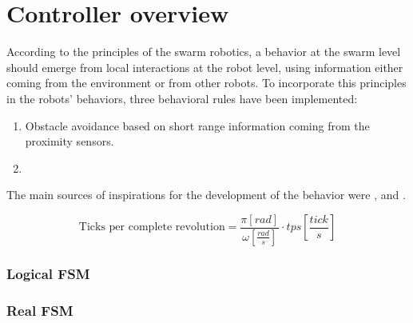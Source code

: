 \section{Controller overview}

According to the principles of the swarm robotics, a behavior at the swarm level should emerge from local interactions at the robot level, using information either coming from the environment or from other robots.
To incorporate this principles in the robots' behaviors, three behavioral rules have been implemented:
\begin{enumerate}
  \item Obstacle avoidance based on short range information coming from the proximity sensors.
  \item 
\end{enumerate}

The main sources of inspirations for the development of the behavior were \cite{nouyan2004chain}, \cite{nouyan2008path} and \cite{goss1992harvesting}. 



\begin{equation}
  \text{Ticks per complete revolution} = \frac{\pi [rad]}{\omega [\frac{rad}{s}]} \cdot tps [\frac{tick}{s}]
\end{equation}


\subsubsection{Logical FSM}

\begin{center}
\end{center}

\subsubsection{Real FSM}


